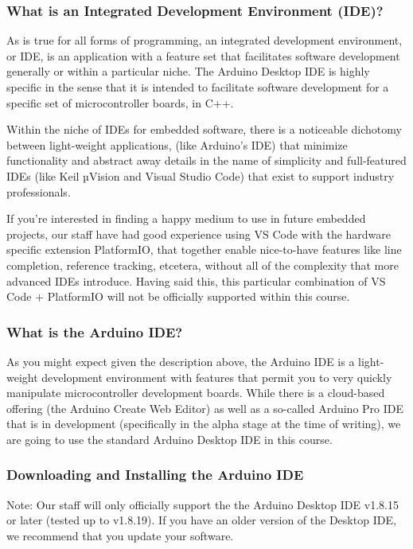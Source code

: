 \subsubsection{What is an Integrated Development Environment (IDE)?}
    As is true for all forms of programming, an integrated development environment, or IDE, is an application with a feature set that facilitates software development generally or within a particular niche. The Arduino Desktop IDE is highly specific in the sense that it is intended to facilitate software development for a specific set of microcontroller boards, in C++.
    
    Within the niche of IDEs for embedded software, there is a noticeable dichotomy between light-weight applications, (like Arduino’s IDE) that minimize functionality and abstract away details in the name of simplicity and full-featured IDEs (like Keil µVision and Visual Studio Code) that exist to support industry professionals. 
    
    If you’re interested in finding a happy medium to use in future embedded projects, our staff have had good experience using VS Code with the hardware specific extension PlatformIO, that together enable nice-to-have features like line completion, reference tracking, etcetera, without all of the complexity that more advanced IDEs introduce. Having said this, this particular combination of VS Code + PlatformIO will not be officially supported within this course.
    
\subsubsection{What is the Arduino IDE?}

    As you might expect given the description above, the Arduino IDE is a light-weight development environment with features that permit you to very quickly manipulate microcontroller development boards. While there is a cloud-based offering (the Arduino Create Web Editor) as well as a so-called Arduino Pro IDE that is in development (specifically in the alpha stage at the time of writing), we are going to use the standard Arduino Desktop IDE in this course.
    
\subsubsection{Downloading and Installing the Arduino IDE}

    Note: Our staff will only officially support the the Arduino Desktop IDE v1.8.15 or later (tested up to v1.8.19). If you have an older version of the Desktop IDE, we recommend that you update your software.

